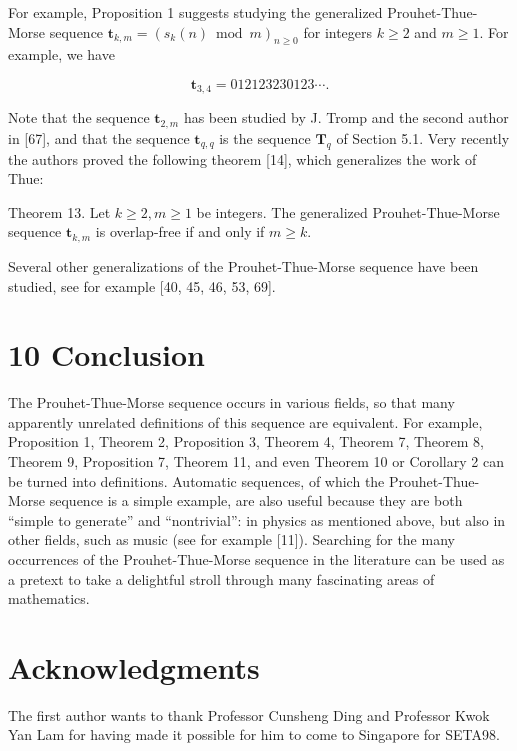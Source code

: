 \documentclass[10pt]{article}
\begin{document}
For example, Proposition 1 suggests studying the generalized Prouhet-Thue-Morse sequence $\mathbf{t}_{k, m}=\left(s_{k}(n) \bmod m\right)_{n \geq 0}$ for integers $k \geq 2$ and $m \geq 1$. For example, we have

\[
\mathbf{t}_{3,4}=012123230123 \cdots.
\]

Note that the sequence $\mathbf{t}_{2, m}$ has been studied by J. Tromp and the second author in [67], and that the sequence $\mathbf{t}_{q, q}$ is the sequence $\mathbf{T}_{q}$ of Section 5.1. Very recently the authors proved the following theorem [14], which generalizes the work of Thue:

Theorem 13. Let $k \geq 2, m \geq 1$ be integers. The generalized Prouhet-Thue-Morse sequence $\mathbf{t}_{k, m}$ is overlap-free if and only if $m \geq k$.

Several other generalizations of the Prouhet-Thue-Morse sequence have been studied, see for example [40, 45, 46, 53, 69].

\section*{10 Conclusion}
The Prouhet-Thue-Morse sequence occurs in various fields, so that many apparently unrelated definitions of this sequence are equivalent. For example, Proposition 1, Theorem 2, Proposition 3, Theorem 4, Theorem 7, Theorem 8, Theorem 9, Proposition 7, Theorem 11, and even Theorem 10 or Corollary 2 can be turned into definitions. Automatic sequences, of which the Prouhet-Thue-Morse sequence is a simple example, are also useful because they are both ``simple to generate'' and ``nontrivial'': in physics as mentioned above, but also in other fields, such as music (see for example [11]). Searching for the many occurrences of the Prouhet-Thue-Morse sequence in the literature can be used as a pretext to take a delightful stroll through many fascinating areas of mathematics.

\section*{Acknowledgments}
The first author wants to thank Professor Cunsheng Ding and Professor Kwok Yan Lam for having made it possible for him to come to Singapore for SETA98.
\end{document}
